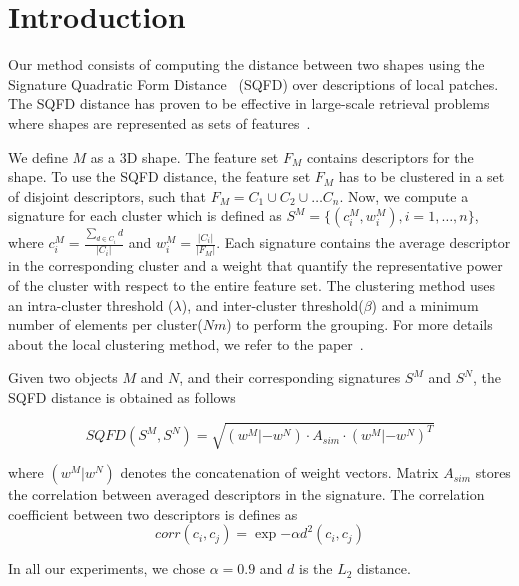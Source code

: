 \section{Introduction}
Our method consists of computing the distance between two shapes using the Signature Quadratic Form Distance~\cite{Beecks2009} (SQFD) over descriptions of local patches. The SQFD distance has proven to be effective in large-scale retrieval problems where shapes are represented as sets of features~\cite{Sipiran2017}. 

We define $M$ as a 3D shape. The feature set $F_M$ contains descriptors for the shape. To use the SQFD distance, the feature set $F_M$ has to be clustered in a set of disjoint descriptors, such that $F_M = C_1 \cup C_2 \cup \ldots C_n$. Now, we compute a signature for each cluster which is defined as $S^M = \{(c_i^M, w_i^M), i=1, \ldots, n\}$, where $c_i^M = \frac{\sum_{d \in C_i} d}{|C_i|}$ and $w_i^M = \frac{|C_i|}{|F_M|}$. Each signature contains the average descriptor in the corresponding cluster and a weight that quantify the representative power of the cluster with respect to the entire feature set. The clustering method uses an intra-cluster threshold ($\lambda$), and inter-cluster threshold($\beta$) and a minimum number of elements per cluster($Nm$) to perform the grouping. For more details about the local clustering method, we refer to the paper~\cite{Sipiran2017}.

Given two objects $M$ and $N$, and their corresponding signatures $S^M$ and $S^N$, the SQFD distance is obtained as follows

\begin{equation}
    SQFD(S^M, S^N) = \sqrt{(w^M | -w^N)\cdot A_{sim} \cdot (w^M | -w^N)^T}
\end{equation}

\noindent where $(w^M | w^N)$ denotes the concatenation of weight vectors. Matrix $A_{sim}$ stores the correlation between averaged descriptors in the signature. The correlation coefficient between two descriptors is defines as 
\begin{equation}
    corr(c_i, c_j) = \exp{-\alpha d^2(c_i, c_j)}
\end{equation}

In all our experiments, we chose $\alpha=0.9$ and $d$ is the $L_2$ distance.

